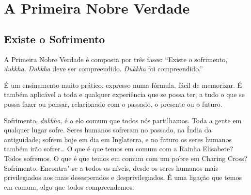 
\chapter{A Primeira Nobre Verdade}

\section{Existe o Sofrimento}

A Primeira Nobre Verdade é composta por três fases: “Existe o sofrimento,
\emph{dukkha}. \emph{Dukkha} deve ser compreendido. \emph{Dukkha} foi
compreendido.”

É um ensinamento muito prático, expresso numa fórmula, fácil de memorizar. É
também aplicável a toda e qualquer experiência que se possa ter, a tudo o que se
possa fazer ou pensar, relacionado com o passado, o presente ou o futuro.

Sofrimento, \emph{dukkha}, é o elo comum que todos nós partilhamos. Toda a gente
em qualquer lugar sofre. Seres humanos sofreram no passado, na Índia da
antiguidade; sofrem hoje em dia em Inglaterra, e no futuro os seres humanos
também irão sofrer\ldots{} O que é que temos em comum com a Rainha Elisabete?
Todos sofremos. O que é que temos em comum com um pobre em Charing Cross?
Sofrimento. Encontra"-se a todos os níveis, desde os seres humanos mais
privilegiados aos mais desesperados e desprivilegiados. É uma ligação que temos
em comum, algo que todos compreendemos.

